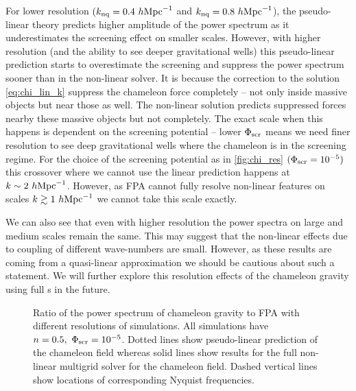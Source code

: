 For lower resolution $(k_{\rm nq} = 0.4~h\text{Mpc}^{-1}$ and $k_{\rm nq} = 0.8~h\text{Mpc}^{-1}$), the pseudo-linear theory predicts higher amplitude of the power spectrum as it underestimates the screening effect on smaller scales. However, with higher resolution (and the ability to see deeper gravitational wells) this pseudo-linear prediction starts to overestimate the screening and suppress the power spectrum sooner than in the non-linear solver. It is because the correction to the solution \eqref{eq:chi_lin_k} suppress the chameleon force completely -- not only inside massive objects but near those as well. The non-linear solution predicts suppressed forces nearby these massive objects but not completely. The exact scale when this happens is dependent on the screening potential -- lower $\Phi_{\text{\scriptsize scr}}$ means we need finer resolution to see deep gravitational wells where the chameleon is in the screening regime. For the choice of the screening potential as in \autoref{fig:chi_res} $(\Phi_{\text{\scriptsize scr}}=10^{-5})$ this crossover where we cannot use the linear prediction happens at $k\sim2~h\text{Mpc}^{-1}$. However, as FPA cannot fully resolve non-linear features on scales $k\gtrsim1~h\text{Mpc}^{-1}$  we cannot take this scale exactly.

We can also see that even with higher resolution the power spectra on large and medium scales remain the same. This may suggest that the non-linear effects due to coupling of different wave-numbers are small. However, as these results are coming from a quasi-linear approximation we should be cautious about such a statement. We will further explore this resolution effects of the chameleon gravity using full \nbody s in the future.

\begin{figure}
  \centering
	\begin{subfigure}{0.5\textwidth}
	\end{subfigure}
	\begin{subfigure}{0.5\textwidth}
	\end{subfigure}
  \caption{Ratio of the power spectrum of chameleon gravity to FPA with different resolutions of simulations. All simulations have $n=0.5,\ \Phi_{\text{\scriptsize scr}}=10^{-5}$. Dotted lines show pseudo-linear prediction of the chameleon field whereas solid lines show results for the full non-linear multigrid solver for the chameleon field. Dashed vertical lines show locations of corresponding Nyquist frequencies.}
  \label{fig:chi_res}
\end{figure}

